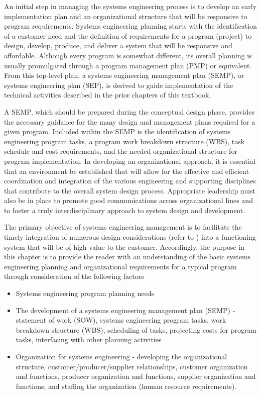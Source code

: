 An initial step in managing the systems engineering process is to develop an early implementation plan and an organizational structure that will be responsive to program requirements. Systems engineering planning starts with the identification of a customer need and the definition of requirements for a program (project) to design, develop, produce, and deliver a system that will be responsive and affordable. Although every program is somewhat different, its overall planning is usually promulgated through a program management plan (PMP) or equivalent. From this top-level plan, a systems engineering management plan (SEMP), or systems engineering plan (SEP), is derived to guide implementation of the technical activities described in the prior chapters of this textbook.

A SEMP, which should be prepared during the conceptual design phase, provides the necessary guidance for the many design and management plans required for a given program. Included within the SEMP is the identification of systems engineering program tasks, a program work breakdown structure (WBS), task schedule and cost requirements, and the needed organizational structure for program implementation. In developing an organizational approach, it is essential that an environment be established that will allow for the effective and efficient coordination and integration of the various engineering and supporting disciplines that contribute to the overall system design process. Appropriate leadership must also be in place to promote good communications across organizational lines and to foster a truly interdisciplinary approach to system design and development.

The primary objective of systems engineering management is to facilitate the timely integration of numerous design considerations (refer to ) into a functioning system that will be of high value to the customer. Accordingly, the purpose in this chapter is to provide the reader with an understanding of the basic systems engineering planning and organizational requirements for a typical program through consideration of the following factors
\begin{itemize}
\item Systems engineering program planning needs
\item The development of a systems engineering management plan (SEMP) - statement of work (SOW), systems engineering program tasks, work breakdown structure (WBS), scheduling of tasks, projecting costs for program tasks, interfacing with other planning activities
\item Organization for systems engineering - developing the organizational structure, customer/producer/supplier relationships, customer organization and functions, producer organization and functions, supplier organization and functions, and staffing the organization (human resource requirements).
\end{itemize}

